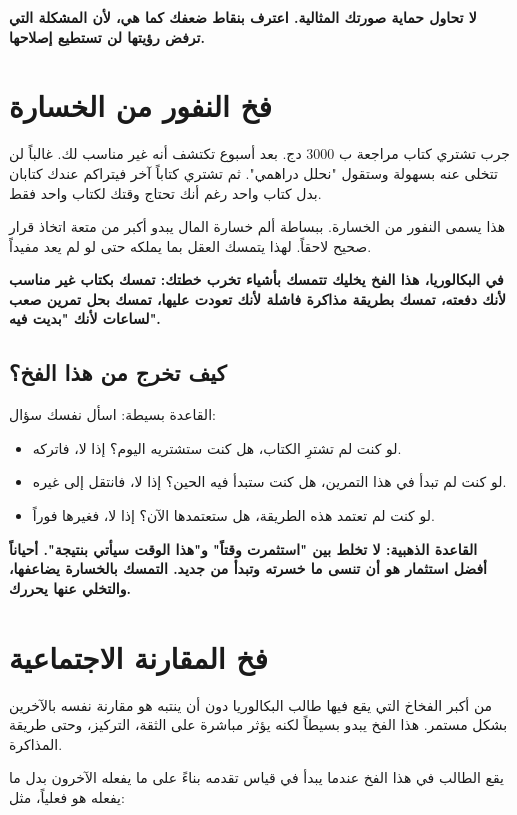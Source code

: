 \documentclass[12pt,a4paper]{book}
\newcommand{\importantAr}[1]{%
	\begin{important}
		\bfseries #1
	\end{important}
}
\begin{document}
	\importantAr{
		لا تحاول حماية صورتك المثالية. اعترف بنقاط ضعفك كما هي، لأن المشكلة التي ترفض رؤيتها لن تستطيع إصلاحها.
	}
	
	\section{فخ النفور من الخسارة}
	\label{sec:loss-aversion}
	جرب تشتري كتاب مراجعة ب 3000 دج. بعد أسبوع تكتشف أنه غير مناسب لك. غالباً لن تتخلى عنه بسهولة وستقول "نحلل دراهمي". ثم تشتري كتاباً آخر فيتراكم عندك كتابان بدل كتاب واحد رغم أنك تحتاج وقتك لكتاب واحد فقط.
	
	هذا يسمى النفور من الخسارة. ببساطة ألم خسارة المال يبدو أكبر من متعة اتخاذ قرار صحيح لاحقاً. لهذا يتمسك العقل بما يملكه حتى لو لم يعد مفيداً.
	\importantAr{في البكالوريا، هذا الفخ يخليك تتمسك بأشياء تخرب خطتك: تمسك بكتاب غير مناسب لأنك دفعته، تمسك بطريقة مذاكرة فاشلة لأنك تعودت عليها، تمسك بحل تمرين صعب لساعات لأنك "بديت فيه".}
	
	\subsection*{كيف تخرج من هذا الفخ؟}
	
	القاعدة بسيطة: اسأل نفسك سؤال:
	
	\begin{itemize}
		\item لو كنت لم تشترِ الكتاب، هل كنت ستشتريه اليوم؟ إذا لا، فاتركه.
		\item لو كنت لم تبدأ في هذا التمرين، هل كنت ستبدأ فيه الحين؟ إذا لا، فانتقل إلى غيره.
		\item لو كنت لم تعتمد هذه الطريقة، هل ستعتمدها الآن؟ إذا لا، فغيرها فوراً.
	\end{itemize}
	
	\importantAr{القاعدة الذهبية: لا تخلط بين "استثمرت وقتاً" و"هذا الوقت سيأتي بنتيجة". أحياناً أفضل استثمار هو أن تنسى ما خسرته وتبدأ من جديد. التمسك بالخسارة يضاعفها، والتخلي عنها يحررك.}
	
	\section{فخ المقارنة الاجتماعية}
	\label{sec:social-comparison}
	
	من أكبر الفخاخ التي يقع فيها طالب البكالوريا دون أن ينتبه هو مقارنة نفسه بالآخرين بشكل مستمر. هذا الفخ يبدو بسيطاً لكنه يؤثر مباشرة على الثقة، التركيز، وحتى طريقة المذاكرة.
	
	يقع الطالب في هذا الفخ عندما يبدأ في قياس تقدمه بناءً على ما يفعله الآخرون بدل ما يفعله هو فعلياً، مثل:
	
\end{document}
